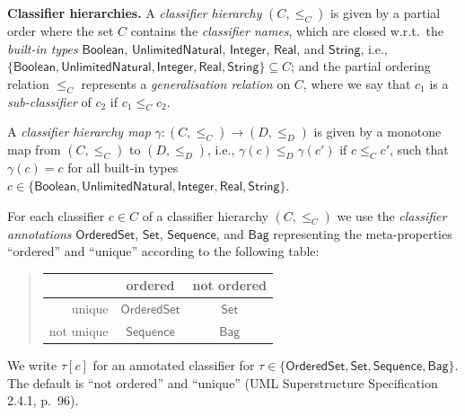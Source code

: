 \documentclass[10pt,fleqn,%
\ifpretendfinal
final%
\else
draft%
\fi,
]{scrreprt}
\begin{document}
\medskip\noindent\textbf{Classifier hierarchies.}
A \emph{classifier hierarchy} $(C, {\leq_C})$ is given by a partial
order where the set $C$ contains the \emph{classifier names}, which are
closed w.r.t.\ the \emph{built-in types} $\mathsf{Boolean}$,
$\mathsf{UnlimitedNatural}$, $\mathsf{Integer}$, $\mathsf{Real}$, and
$\mathsf{String}$, i.e.,
$\{ \mathsf{Boolean}, \mathsf{UnlimitedNatural}, \mathsf{Integer},
\mathsf{Real}, \mathsf{String} \} \subseteq C$;
and the partial ordering relation $\leq_C$ represents a
\emph{generalisation relation} on $C$, where we say that $c_1$ is a
\emph{sub-classifier} of $c_2$ if $c_1 \leq_C c_2$.

A \emph{classifier hierarchy map}
$\gamma : (C, {\leq_C}) \to (D, {\leq_D})$ is given by a monotone map
from $(C, {\leq_C})$ to $(D, {\leq_D})$, i.e.,
$\gamma(c) \leq_D \gamma(c')$ if $c \leq_C c'$, such that
$\gamma(c) = c$ for all built-in types
$c \in \{ \mathsf{Boolean},\allowbreak \mathsf{UnlimitedNatural},\allowbreak
\mathsf{Integer}, \mathsf{Real}, \mathsf{String} \}$.

For each classifier $c \in C$ of a classifier hierarchy $(C, {\leq_C})$
we use the \emph{classifier annotations} $\mathsf{OrderedSet}$,
$\mathsf{Set}$, $\mathsf{Sequence}$, and $\mathsf{Bag}$ representing the
meta-properties ``ordered'' and ``unique'' according to the following
table:

\begin{quotation}
\begin{tabular}{@{}r||c|c@{}}
             & ordered               & not ordered\\
\hline\hline
  unique     & $\mathsf{OrderedSet}$ & $\mathsf{Set}$\\
\hline
  not unique & $\mathsf{Sequence}$   & $\mathsf{Bag}$
\end{tabular}
\end{quotation}

We write $\tau[c]$ for an annotated classifier for
$\tau \in \{ \mathsf{OrderedSet}, \mathsf{Set}, \mathsf{Sequence},
\mathsf{Bag} \}$.
The default is ``not ordered'' and ``unique'' (UML Superstructure
Specification 2.4.1, p.~96).
\end{document}
